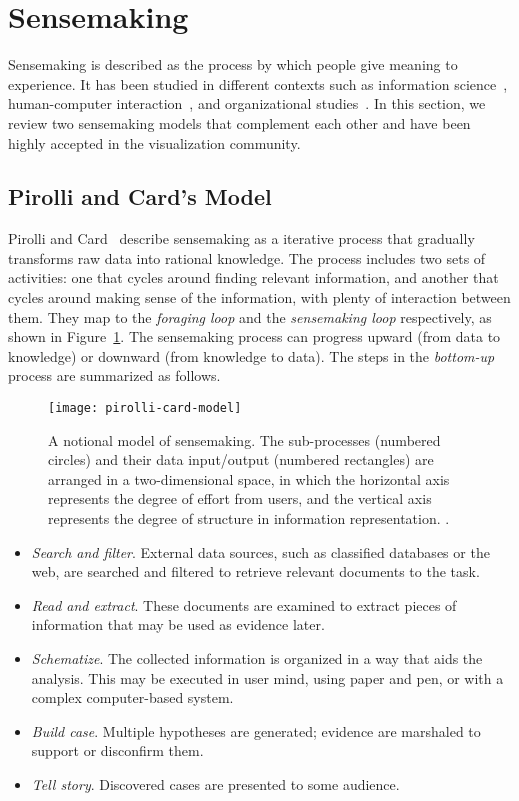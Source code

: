 \section{Sensemaking}
Sensemaking is described as the process by which people give meaning to experience. It has been studied in different contexts such as information science~\cite{Dervin1983}, human-computer interaction~\cite{Russell1993}, and organizational studies~\cite{Weick1995}. In this section, we review two sensemaking models that complement each other and have been highly accepted in the visualization community.

\subsection{Pirolli and Card's Model}
\label{sub:rv-pcm}
Pirolli and Card~\cite{Pirolli2005} describe sensemaking as a iterative process that gradually transforms raw data into rational knowledge. The process includes two sets of activities: one that cycles around finding relevant information, and another that cycles around making sense of the information, with plenty of interaction between them. They map to the \emph{foraging loop} and the \emph{sensemaking loop} respectively, as shown in Figure~\ref{fig:pirolli-card-model}. The sensemaking process can progress upward (from data to knowledge) or downward (from knowledge to data). The steps in the \emph{bottom-up} process are summarized as follows.

\begin{figure}[!htb]
	\centering
	\texttt{[image: pirolli-card-model]}
	\caption{A notional model of sensemaking. The sub-processes (numbered circles) and their data input/output (numbered rectangles) are arranged in a two-dimensional space, in which the horizontal axis represents the degree of effort from users, and the vertical axis represents the degree of structure in information representation. .}
	\label{fig:pirolli-card-model}
\end{figure}

\begin{itemize}
	\item \emph{Search and filter}. External data sources, such as classified databases or the web, are searched and filtered to retrieve relevant documents to the task.
	\item \emph{Read and extract}. These documents are examined to extract pieces of information that may be used as evidence later.
	\item \emph{Schematize}.  The collected information is organized in a way that aids the analysis. This may be executed in user mind, using paper and pen, or with a complex computer-based system.
	\item \emph{Build case}. Multiple hypotheses are generated; evidence are marshaled to support or disconfirm them.
	\item \emph{Tell story}. Discovered cases are presented to some audience.
\end{itemize}

